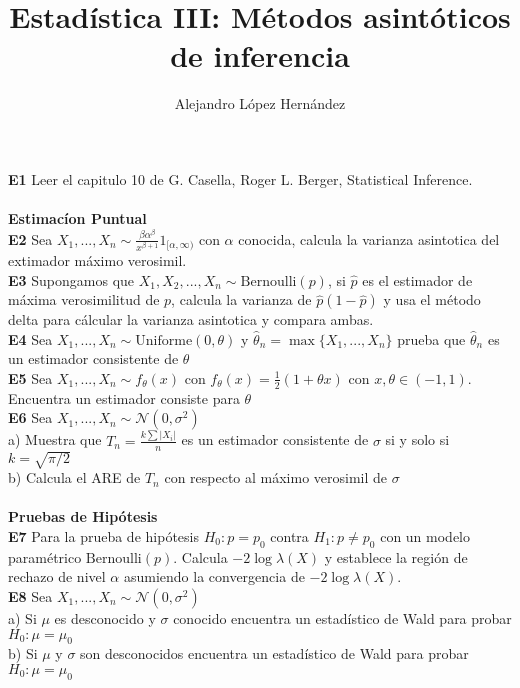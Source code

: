 \documentclass[11pt,spanish]{article}
\title{Estadística III: Métodos asintóticos de inferencia}
\author{Alejandro López Hernández}
\begin{document}
\maketitle
\setlength\parindent{0pt}
\textbf{E1} Leer el capitulo 10 de G. Casella, Roger L. Berger, Statistical Inference\cite{Casella}. \\\\
\textbf{Estimacíon Puntual} \\
\textbf{E2} Sea $X_1,...,X_n\sim\frac{\beta\alpha^\beta}{x^{\beta+1}}1_{[\alpha,\infty)}$ con $\alpha$ conocida, calcula la varianza asintotica del extimador máximo verosimil.  \\
\textbf{E3} Supongamos que $X_1,X_2,...,X_n\sim\text{Bernoulli}(p)$, si $\hat{p}$ es el estimador de máxima verosimilitud de $p$, calcula la varianza de $\hat{p}(1-\hat{p})$ y usa el método delta para cálcular la varianza asintotica y compara ambas. \\
\textbf{E4} Sea $X_1,...,X_n\sim \text{Uniforme}(0,\theta)$ y $\hat\theta_n=\max\{X_1,...,X_n\}$ prueba que $\hat\theta_n$ es un estimador consistente de $\theta$\\
\textbf{E5} Sea $X_1,...,X_n\sim f_\theta (x)$ con $f_\theta (x)=\frac{1}{2}(1+\theta x)$ con $x,\theta \in (-1,1)$. Encuentra un estimador consiste para $\theta$ \\
\textbf{E6} Sea $X_1,...,X_n\sim \mathcal{N}(0,\sigma^2)$ \\
\hspace*{6mm} a) Muestra que $T_n=\frac{k\sum |X_i|}{n}$ es un estimador consistente de $\sigma$ si y solo si $k=\sqrt{\pi/2}$\\
\hspace*{6mm} b) Calcula el ARE de $T_n$ con respecto al máximo verosimil de $\sigma$\\\\
\textbf{Pruebas de Hipótesis}\\
\textbf{E7} Para la prueba de hipótesis $H_0:p=p_0$ contra $H_1:p\neq p_0$ con un modelo paramétrico $\text{Bernoulli}(p)$. Calcula $-2\log{\lambda(X)}$ y establece la región de rechazo de nivel $\alpha$ asumiendo la convergencia de $-2\log{\lambda(X)}$.\\
\textbf{E8} Sea $X_1,...,X_n\sim \mathcal{N}(0,\sigma^2)$\\
\hspace*{6mm} a) Si $\mu$ es desconocido y $\sigma$ conocido encuentra un estadístico de Wald para probar $H_0:\mu=\mu_0$\\
\hspace*{6mm} b) Si $\mu$ y $\sigma$ son desconocidos encuentra un estadístico de Wald para probar $H_0:\mu=\mu_0$\\
\end{document}
